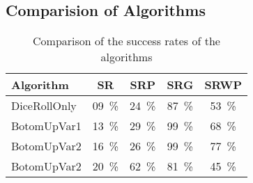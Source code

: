 \pagebreak
\subsection{Comparision of Algorithms}

\begin{table}[H]
	\centering
	\begin{tabular}{ | l | c |c |c |c | }
		\hline
Algorithm 		& SR 	& SRP 	& SRG 	& SRWP   	\\ \hline
\hline
DiceRollOnly 	& 09~\%	& 24~\% & 87~\% & 53~\%		\\ \hline
BotomUpVar1 	& 13~\% & 29~\% & 99~\% & 68~\% 	\\ \hline
BotomUpVar2 	& 16~\% & 26~\% & 99~\% & 77~\% 	\\ \hline
BotomUpVar2 	& 20~\% & 62~\% & 81~\% & 45~\% 	\\ \hline
	\end{tabular}
	\caption{Comparison of the success rates of the algorithms}
	\label{comparisonAlgorithms}
\end{table}

\pagebreak